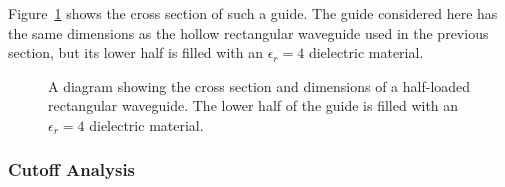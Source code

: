 Figure~\ref{lezar:fig:half_filled_rectangular_guide} shows the cross section
of such a guide. The guide considered here has the same dimensions as
the hollow rectangular waveguide used in the previous section, but its
lower half is filled with an $\epsilon_r = 4$ dielectric material.
\begin{figure}
    \centering
    \caption{A diagram showing the cross section and dimensions of a half-loaded rectangular waveguide.  The lower half of the guide is filled with an $\epsilon_r = 4$ dielectric material.}
    \label{lezar:fig:half_filled_rectangular_guide}
\end{figure}

\subsubsection{Cutoff Analysis}

